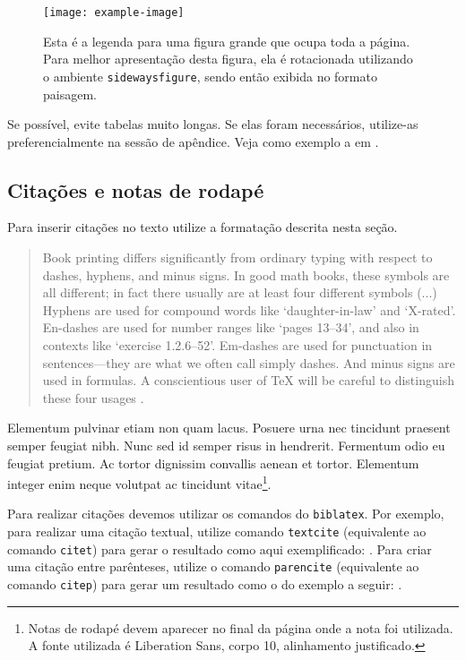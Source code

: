 \documentclass[anonymous=true]{textolivre}
\begin{document}
\begin{sidewaysfigure}
\centering
\texttt{[image: example-image]}
\caption{Esta é a legenda para uma figura grande que ocupa toda a página. Para melhor apresentação desta figura, ela é rotacionada utilizando o ambiente \texttt{sidewaysfigure}, sendo então exibida no formato paisagem.}
\label{fig:landscape}
\end{sidewaysfigure}


Se possível, evite tabelas muito longas. Se elas foram necessários, utilize-as preferencialmente na sessão de apêndice. 
Veja como exemplo a  em .



\subsection{Citações e notas de rodapé}\label{sec-quotesandfootnotes}
Para inserir citações no texto utilize a formatação descrita nesta seção. 

\begin{quote}
Book printing differs significantly from ordinary typing with respect to dashes, hyphens, and minus signs.
In good math books, these symbols are all different; in fact there usually are at least four different symbols (...)
Hyphens are used for compound words like `daughter-in-law' and `X-rated'. En-dashes are used for number ranges like 
`pages 13--34', and also in contexts like `exercise 1.2.6--52'. 
Em-dashes are used for punctuation in sentences---they are what we often call simply dashes. 
And minus signs are used in formulas. A conscientious user of \TeX{} will be careful to distinguish these four usages 
\cite[p. 4]{donaldknuth1984}.
\end{quote}

Elementum pulvinar etiam non quam lacus. Posuere urna nec tincidunt praesent semper feugiat nibh. 
Nunc sed id semper risus in hendrerit. Fermentum odio eu feugiat pretium. 
Ac tortor dignissim convallis aenean et tortor. 
Elementum integer enim neque volutpat ac tincidunt vitae\footnote{
Notas de rodapé devem aparecer no final da página onde a nota foi utilizada. A fonte utilizada é  Liberation Sans, corpo 10, alinhamento justificado.
}.

Para realizar citações devemos utilizar os comandos do \texttt{biblatex}. Por exemplo, para realizar uma
citação textual, utilize comando \texttt{textcite} (equivalente ao comando \texttt{citet}) para gerar o
resultado como aqui exemplificado: \textcite{donaldknuth1984}. 
Para criar uma citação entre parênteses, utilize o comando \texttt{parencite} (equivalente ao comando \texttt{citep})
para gerar um resultado como o do exemplo a seguir: \parencite{donaldknuth1984}.
\end{document}
